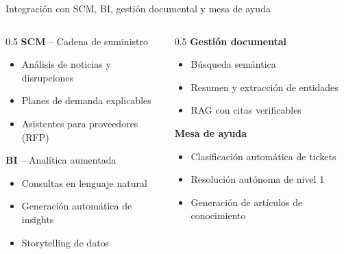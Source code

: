 \documentclass[10pt,aspectratio=169]{beamer}
\begin{document}
\begin{frame}{Integración con SCM, BI, gestión documental y mesa de ayuda}
    \begin{columns}[T]
        \begin{column}{0.5\textwidth}
            \textbf{\textcolor{azulPrincipal}{SCM}} -- Cadena de suministro
            \begin{itemize}
                \item Análisis de noticias y disrupciones
                \item Planes de demanda explicables
                \item Asistentes para proveedores (RFP)
            \end{itemize}
            \textbf{\textcolor{azulPrincipal}{BI}} -- Analítica aumentada
            \begin{itemize}
                \item Consultas en lenguaje natural
                \item Generación automática de insights
                \item Storytelling de datos
            \end{itemize}
        \end{column}
        \begin{column}{0.5\textwidth}
            \textbf{\textcolor{azulPrincipal}{Gestión documental}}
            \begin{itemize}
                \item Búsqueda semántica
                \item Resumen y extracción de entidades
                \item RAG con citas verificables
            \end{itemize}
            \textbf{\textcolor{azulPrincipal}{Mesa de ayuda}}
            \begin{itemize}
                \item Clasificación automática de tickets
                \item Resolución autónoma de nivel 1
                \item Generación de artículos de conocimiento
            \end{itemize}
        \end{column}
    \end{columns}
\end{frame}

\end{document}
